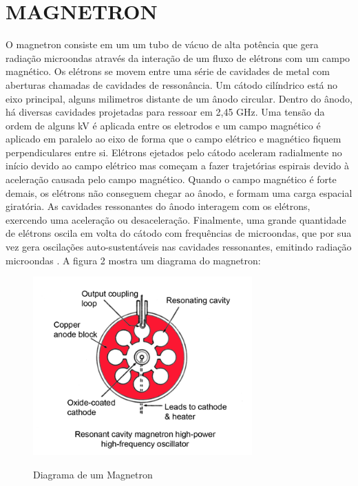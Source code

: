 \section{MAGNETRON}
\label{sec:magnetron}

O magnetron consiste em um um tubo de vácuo de alta potência que gera radiação microondas através da interação de um fluxo de elétrons com um campo magnético. Os elétrons se movem entre uma série de cavidades de metal com aberturas chamadas de cavidades de ressonância. Um cátodo cilíndrico está no eixo principal, alguns milimetros distante de um ânodo circular. Dentro do ânodo, há diversas cavidades projetadas para ressoar em 2,45 GHz. Uma tensão da ordem de alguns kV é aplicada entre os eletrodos e um campo magnético é aplicado em paralelo ao eixo de forma que o campo elétrico e magnético fiquem perpendiculares entre si. Elétrons ejetados pelo cátodo aceleram radialmente no início devido ao campo elétrico mas começam a fazer trajetórias espirais devido à aceleração causada pelo campo magnético. Quando o campo magnético é forte demais, os elétrons não conseguem chegar ao ânodo, e formam uma carga espacial giratória. As cavidades ressonantes do ânodo interagem com os elétrons, exercendo uma aceleração ou desaceleração. Finalmente, uma grande quantidade de elétrons oscila em volta do cátodo com frequências de microondas, que por sua vez gera oscilações auto-sustentáveis nas cavidades ressonantes, emitindo radiação microondas \cite{Vollmer}. A figura 2 mostra um diagrama do magnetron:

\begin{figure}[!htb]
    \centering
    \caption{Diagrama de um Magnetron}
    \includegraphics[width=0.75\textwidth]{./dados/figuras/magnetron}
    \label{fig:figura-magnetron}
\end{figure}


